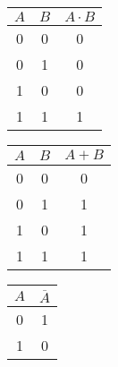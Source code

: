 \documentclass{article}
\begin{document}
\begin{table}[h!]
    \centering
    \begin{tabular}{cc|c}
        $A$&$B$&$A\cdot B$\\
        \midrule
        0&0&0\\
        0&1&0\\
        1&0&0\\
        1&1&1\\
    \end{tabular}    
    \begin{tabular}{cc|c}
        $A$&$B$&$A+B$\\
        \midrule
        0&0&0\\
        0&1&1\\
        1&0&1\\
        1&1&1\\
    \end{tabular}
    \begin{tabular}{c|c}
        $A$&$\overline{A}$\\
        \midrule
        0&1\\
        1&0\\
    \end{tabular}
\end{table}
\end{document}

